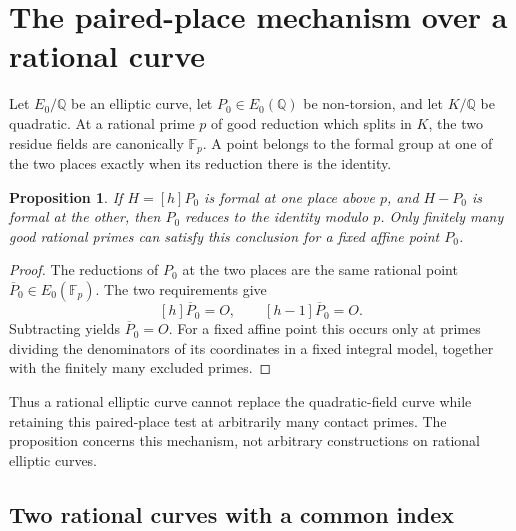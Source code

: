 \documentclass[11pt,a4paper]{article}
\newtheorem{proposition}[theorem]{Proposition}
\theoremstyle{remark}\newtheorem{remark}[theorem]{Remark}
\newcommand{\Q}{\mathbb Q}\newcommand{\Z}{\mathbb Z}
\begin{document}
\section{The paired-place mechanism over a rational curve}

Let $E_0/\Q$ be an elliptic curve, let $P_0\in E_0(\Q)$ be
non-torsion, and let $K/\Q$ be quadratic.  At a rational prime
$p$ of good reduction which splits in $K$, the two residue fields
are canonically $\mathbb F_p$.  A point belongs to the formal
group at one of the two places exactly when its reduction there
is the identity.

\begin{proposition}\label{prop:rational-curve}
If $H=[h]P_0$ is formal at one place above $p$, and $H-P_0$ is
formal at the other, then $P_0$ reduces to the identity modulo $p$.
Only finitely many good rational primes can satisfy this conclusion
for a fixed affine point $P_0$.
\end{proposition}
\begin{proof}
The reductions of $P_0$ at the two places are the same rational
point $\overline P_0\in E_0(\mathbb F_p)$.  The two requirements give
\[
              [h]\overline P_0=O,
              \qquad[h-1]\overline P_0=O.
\]
Subtracting yields $\overline P_0=O$.
For a fixed affine point this occurs only at primes dividing
the denominators of its coordinates in a fixed integral model,
together with the finitely many excluded primes.
\end{proof}

Thus a rational elliptic curve cannot replace the quadratic-field
curve while retaining this paired-place test at arbitrarily many
contact primes.  The proposition concerns this mechanism, not
arbitrary constructions on rational elliptic curves.

\subsection{Two rational curves with a common index}
\end{document}
